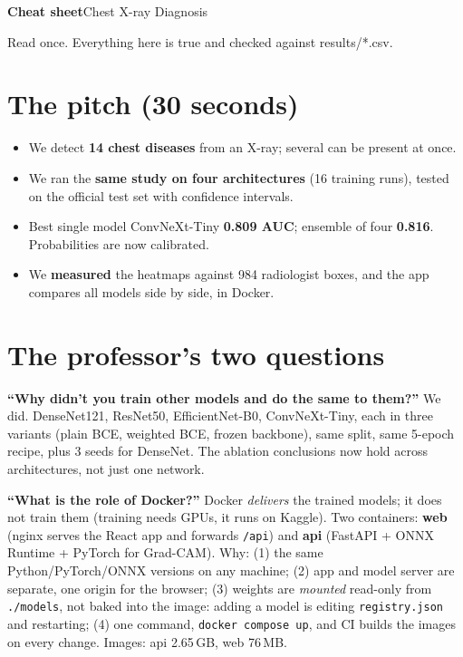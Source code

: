 \documentclass[11pt,a4paper]{article}
\begin{document}
{\LARGE\bfseries Cheat sheet}\hfill{\small Chest X-ray Diagnosis}\par
{\small Read once. Everything here is true and checked against results/*.csv.}

\section*{The pitch (30 seconds)}
\begin{itemize}
  \item We detect \textbf{14 chest diseases} from an X-ray; several can be present at once.
  \item We ran the \textbf{same study on four architectures} (16 training runs), tested on the official test set with confidence intervals.
  \item Best single model ConvNeXt-Tiny \textbf{0.809 AUC}; ensemble of four \textbf{0.816}. Probabilities are now calibrated.
  \item We \textbf{measured} the heatmaps against 984 radiologist boxes, and the app compares all models side by side, in Docker.
\end{itemize}

\section*{The professor's two questions}
\textbf{``Why didn't you train other models and do the same to them?''} We did. DenseNet121, ResNet50, EfficientNet-B0, ConvNeXt-Tiny, each in three variants (plain BCE, weighted BCE, frozen backbone), same split, same 5-epoch recipe, plus 3 seeds for DenseNet. The ablation conclusions now hold across architectures, not just one network.

\textbf{``What is the role of Docker?''} Docker \emph{delivers} the trained models; it does not train them (training needs GPUs, it runs on Kaggle). Two containers: \textbf{web} (nginx serves the React app and forwards \texttt{/api}) and \textbf{api} (FastAPI + ONNX Runtime + PyTorch for Grad-CAM). Why: (1) the same Python/PyTorch/ONNX versions on any machine; (2) app and model server are separate, one origin for the browser; (3) weights are \emph{mounted} read-only from \texttt{./models}, not baked into the image: adding a model is editing \texttt{registry.json} and restarting; (4) one command, \texttt{docker compose up}, and CI builds the images on every change. Images: api 2.65\,GB, web 76\,MB.
\end{document}
